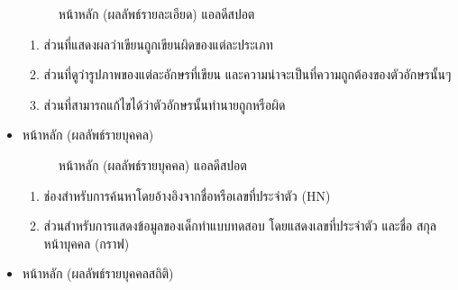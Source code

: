 \documentclass[12pt,oneside,openright,a4paper]{cpe-thai-project}
\begin{document}
\begin{itemize}
\begin{figure}[!ht]
    \caption{หน้าหลัก (ผลลัพธ์รายละเอียด) แอลดีสปอต}\label{fig:system}
  \end{figure}
  \begin{enumerate}
    \item ส่วนที่แสดงผลว่าเขียนถูกเขียนผิดของแต่ละประเภท
    \item ส่วนที่ดูว่ารูปภาพของแต่ละอักษรที่เขียน และความน่าจะเป็นที่ความถูกต้องของตัวอักษรนั้นๆ
    \item ส่วนที่สามารถแก้ไขได้ว่าตัวอักษรนั้นทำนายถูกหรือผิด
  \end{enumerate}
  \newpage
  \item หน้าหลัก (ผลลัพธ์รายบุคคล)
  \begin{figure}[!ht]\centering
    \setlength{\fboxrule}{0.2mm} %
    \setlength{\fboxsep}{1cm}
    \caption{หน้าหลัก (ผลลัพธ์รายบุคคล) แอลดีสปอต}\label{fig:endgame}
  \end{figure}
  \begin{enumerate}
    \item ช่องสำหรับการค้นหาโดยอ้างอิงจากชื่อหรือเลขที่ประจำตัว (HN)
    \item ส่วนสำหรับการแสดงข้อมูลของเด็กทำแบบทดสอบ โดยแสดงเลขที่ประจำตัว และชื่อ สกุล
    หน้าบุคคล (กราฟ)
  \end{enumerate}
  \newpage
  \item หน้าหลัก (ผลลัพธ์รายบุคคลสถิติ)
  \begin{figure}[!ht]\centering
    \setlength{\fboxrule}{0.2mm} %
    \setlength{\fboxsep}{1cm}

\end{figure}
\end{itemize}
\end{document}
